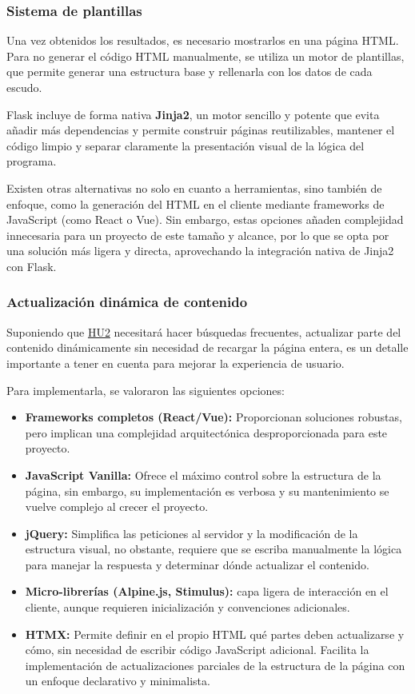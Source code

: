 \subsubsection{Sistema de plantillas}
Una vez obtenidos los resultados, es necesario mostrarlos en una página HTML. Para no generar el código 
HTML manualmente, se utiliza un motor de plantillas, que permite generar una estructura base y rellenarla
con los datos de cada escudo.  

Flask incluye de forma nativa \textbf{Jinja2}, un motor sencillo y potente que evita añadir más dependencias y
permite construir páginas reutilizables, mantener el código limpio y separar claramente la presentación visual 
de la lógica del programa.

Existen otras alternativas no solo en cuanto a herramientas, sino también de enfoque, como la generación del
HTML en el cliente mediante frameworks de JavaScript (como React o Vue). Sin embargo, estas opciones añaden
complejidad innecesaria para un proyecto de este tamaño y alcance, por lo que se opta por una solución más 
ligera y directa, aprovechando la integración nativa de Jinja2 con Flask.

\subsubsection{Actualización dinámica de contenido}
Suponiendo que \hyperref[sec:hu2]{HU2} necesitará hacer búsquedas frecuentes, actualizar parte del contenido
dinámicamente sin necesidad de recargar la página entera, es un detalle importante a tener en cuenta para
mejorar la experiencia de usuario.

Para implementarla, se valoraron las siguientes opciones:

\begin{itemize}
    \item \textbf{Frameworks completos (React/Vue):} Proporcionan soluciones robustas, pero implican una 
    complejidad arquitectónica desproporcionada para este proyecto.
    \item \textbf{JavaScript Vanilla:} Ofrece el máximo control sobre la estructura de la página, sin embargo,
    su implementación es verbosa y su mantenimiento se vuelve complejo al crecer el proyecto.
    \item \textbf{jQuery:} Simplifica las peticiones al servidor y la modificación de la estructura visual,
    no obstante, requiere que se escriba manualmente la lógica para manejar la respuesta y determinar dónde
    actualizar el contenido.
    \item \textbf{Micro-librerías (Alpine.js, Stimulus):} capa ligera de interacción en el cliente, aunque 
    requieren inicialización y convenciones adicionales.
    \item \textbf{HTMX:} Permite definir en el propio HTML qué partes deben actualizarse y cómo, sin necesidad
    de escribir código JavaScript adicional. Facilita la implementación de actualizaciones parciales de la
    estructura de la página con un enfoque declarativo y minimalista.
\end{itemize}

